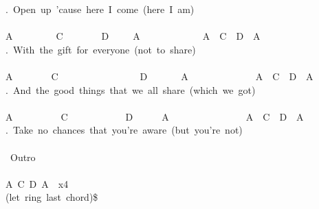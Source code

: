 {.\ Open\ up\ 'cause\ here\ I\ come\ (here\ I\ am)\\
\\
A\ \ \ \ \ \ \ \ \ C\ \ \ \ \ \ \ \ D\ \ \ \ \ A\ \ \ \ \ \ \ \ \ \ \ \ \ A\ \ C\ \ D\ \ A\ \ \\
.\ With\ the\ gift\ for\ everyone\ (not\ to\ share)\\
\\
A\ \ \ \ \ \ \ \ C\ \ \ \ \ \ \ \ \ \ \ \ \ \ \ \ \ D\ \ \ \ \ \ \ A\ \ \ \ \ \ \ \ \ \ \ \ \ \ A\ \ C\ \ D\ \ A\ \ \\
.\ And\ the\ good\ things\ that\ we\ all\ share\ (which\ we\ got)\\
\\
A\ \ \ \ \ \ \ \ \ \ C\ \ \ \ \ \ \ \ \ \ \ \ D\ \ \ \ \ \ A\ \ \ \ \ \ \ \ \ \ \ \ \ \ \ \ A\ \ C\ \ D\ \ A\ \ \\
.\ Take\ no\ chances\ that\ you're\ aware\ (but\ you're\ not)\\
\\
\lbrack\ Outro\rbrack\\
\\
A\ C\ D\ A\ \ x4\\
(let\ ring\ last\ chord)\$}
